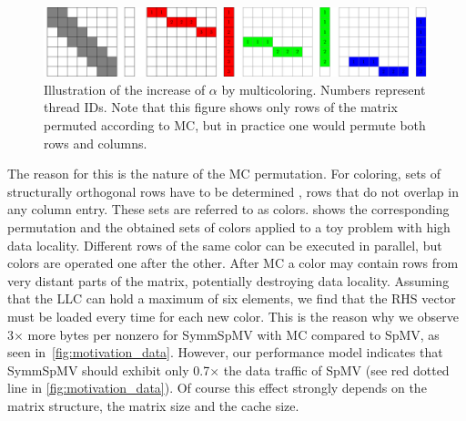  \begin{figure}[tbp]
  	\centering
  	\includegraphics[scale=0.45]{pics/mc_alpha_problem/mc_alpha_unsymm}
  	\caption{Illustration of the increase of $\alpha$ by multicoloring. Numbers represent thread IDs. Note that this figure shows only rows of the matrix permuted according to \acrshort{MC}, but in practice one would permute both rows and columns.}
  	\label{fig:mc_alpha}
  \end{figure}
  
The reason for this is the nature of the \acrlong{MC}
permutation. For \DTWO coloring, sets of structurally orthogonal
rows have to be determined \cite{dist_k_def}, \ie rows that do not
overlap in any column entry. These sets are referred to as colors.  shows the corresponding permutation
and the obtained sets of colors applied to a toy problem with high
data locality. Different rows of the same color can be executed in
parallel, but colors are operated one after the
other. After \acrlong{MC} a color may contain rows from very distant
parts of the matrix, potentially destroying data locality.  Assuming
that the \acrshort{LLC} can hold a maximum of six elements, we find
that the RHS vector must be loaded every time for each
new color. This is the reason why we observe 3$\times$ more bytes
per nonzero for \acrshort{SymmSpMV} with \acrshort{MC} compared
to \acrshort{SpMV}, as seen in~\cref{fig:motivation_data}.  However,
our performance model indicates that \acrshort{SymmSpMV} should
exhibit only 0.7$\times$ the data traffic of \acrshort{SpMV} (see
red dotted line in \cref{fig:motivation_data}). Of course this
effect strongly depends on the matrix structure, the matrix size and
the cache size.
        
